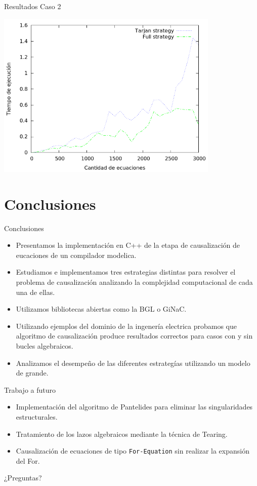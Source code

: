 \begin{frame}{Resultados Caso 2}
\begin{center}
\includegraphics[width=0.8\textwidth]{graphics/OneDHeatTransfer_loop.png}
\end{center}
\end{frame}

\section{Conclusiones}

\begin{frame}{Conclusiones}
    \begin{itemize}
        \item<1-> Presentamos la implementación en C++ de la etapa de causalización de eucaciones de un compilador modelica.
        \item<2-> Estudiamos e implementamos tres estrategias distintas para resolver el problema de causalización analizando la complejidad computacional de cada una de ellas.
        \item<3-> Utilizamos bibliotecas abiertas como la BGL o GiNaC.
        \item<4-> Utilizando ejemplos del dominio de la ingenería electrica probamos que algoritmo de causalización produce resultados correctos para casos con y sin bucles algebraicos.
        \item<5-> Analizamos el desempeño de las diferentes estrategías utilizando un modelo de grande.
    \end{itemize}
\end{frame}

\begin{frame}[fragile]{Trabajo a futuro}
    \begin{itemize}
        \item Implementación del algoritmo de Pantelides para eliminar las singularidades estructurales.
        \item Tratamiento de los lazos algebraicos mediante la técnica de Tearing.
        \item Causalización de ecuaciones de tipo \verb+For-Equation+ sin realizar la expansión del For.
    \end{itemize}
\end{frame}

\begin{frame}{}
\begin{center}
    ¿Preguntas?
\end{center}
\end{frame}
